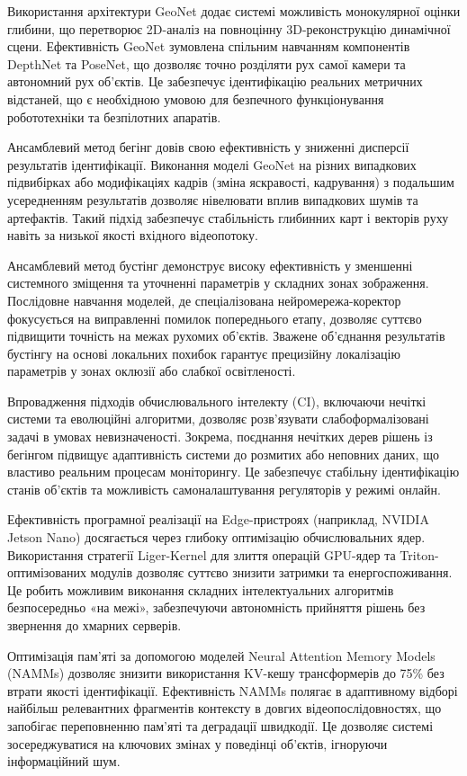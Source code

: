 \documentclass[
]{article}
\begin{document}
Використання архітектури GeoNet додає системі можливість монокулярної оцінки глибини, що перетворює 2D-аналіз на повноцінну 3D-реконструкцію динамічної сцени. Ефективність GeoNet зумовлена спільним навчанням компонентів DepthNet та PoseNet, що дозволяє точно розділяти рух самої камери та автономний рух об'єктів. Це забезпечує ідентифікацію реальних метричних відстаней, що є необхідною умовою для безпечного функціонування робототехніки та безпілотних апаратів.

Ансамблевий метод бегінг довів свою ефективність у зниженні дисперсії результатів ідентифікації. Виконання моделі GeoNet на різних випадкових підвибірках або модифікаціях кадрів (зміна яскравості, кадрування) з подальшим усередненням результатів дозволяє нівелювати вплив випадкових шумів та артефактів. Такий підхід забезпечує стабільність глибинних карт і векторів руху навіть за низької якості вхідного відеопотоку.

Ансамблевий метод бустінг демонструє високу ефективність у зменшенні системного зміщення та уточненні параметрів у складних зонах зображення. Послідовне навчання моделей, де спеціалізована нейромережа-коректор фокусується на виправленні помилок попереднього етапу, дозволяє суттєво підвищити точність на межах рухомих об'єктів. Зважене об'єднання результатів бустінгу на основі локальних похибок гарантує прецизійну локалізацію параметрів у зонах оклюзії або слабкої освітленості.

Впровадження підходів обчислювального інтелекту (CI), включаючи нечіткі системи та еволюційні алгоритми, дозволяє розв'язувати слабоформалізовані задачі в умовах невизначеності. Зокрема, поєднання нечітких дерев рішень із бегінгом підвищує адаптивність системи до розмитих або неповних даних, що властиво реальним процесам моніторингу. Це забезпечує стабільну ідентифікацію станів об'єктів та можливість самоналаштування регуляторів у режимі онлайн.

Ефективність програмної реалізації на Edge-пристроях (наприклад, NVIDIA Jetson Nano) досягається через глибоку оптимізацію обчислювальних ядер. Використання стратегії Liger-Kernel для злиття операцій GPU-ядер та Triton-оптимізованих модулів дозволяє суттєво знизити затримки та енергоспоживання. Це робить можливим виконання складних інтелектуальних алгоритмів безпосередньо «на межі», забезпечуючи автономність прийняття рішень без звернення до хмарних серверів.

Оптимізація пам'яті за допомогою моделей Neural Attention Memory Models (NAMMs) дозволяє знизити використання KV-кешу трансформерів до 75\% без втрати якості ідентифікації. Ефективність NAMMs полягає в адаптивному відборі найбільш релевантних фрагментів контексту в довгих відеопослідовностях, що запобігає переповненню пам'яті та деградації швидкодії. Це дозволяє системі зосереджуватися на ключових змінах у поведінці об'єктів, ігноруючи інформаційний шум.
\end{document}
